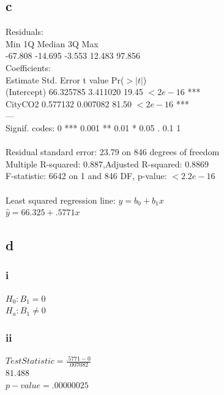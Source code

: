 \documentclass[10pt,letterpaper]{article}
\begin{document}
\subsection*{c}
Residuals:\\
    Min      1Q  Median      3Q     Max \\
    -67.808 -14.695  -3.553  12.483  97.856\\ 

    Coefficients:\\
                 Estimate Std. Error t value Pr($>|t|$)\\    
		 (Intercept) 66.325785   3.411020   19.45   $<2e-16$ ***\\
		 CityCO2      0.577132   0.007082   81.50   $<2e-16$ ***\\
		 ---\\
		 Signif. codes:  0 *** 0.001 ** 0.01 * 0.05 . 0.1   1\\
\\
		 Residual standard error: 23.79 on 846 degrees of freedom\\
		 Multiple R-squared:  0.887,Adjusted R-squared:  0.8869 \\
		 F-statistic:  6642 on 1 and 846 DF,  p-value: $< 2.2e-16$\\
\\
Least squared regression line: $\hat{y} = b_0 + b_1 x$\\
$\hat{y} = 66.325+.5771x$

\subsection*{d}
\subsubsection*{i}
$H_0 \colon B_1 = 0$\\
$H_a \colon B_1 \neq 0$\\

\subsubsection*{ii}
$Test Statistic = \frac{.5771-0}{.007082}$\\
$81.488$\\

$p-value=.00000025$
\end{document}
